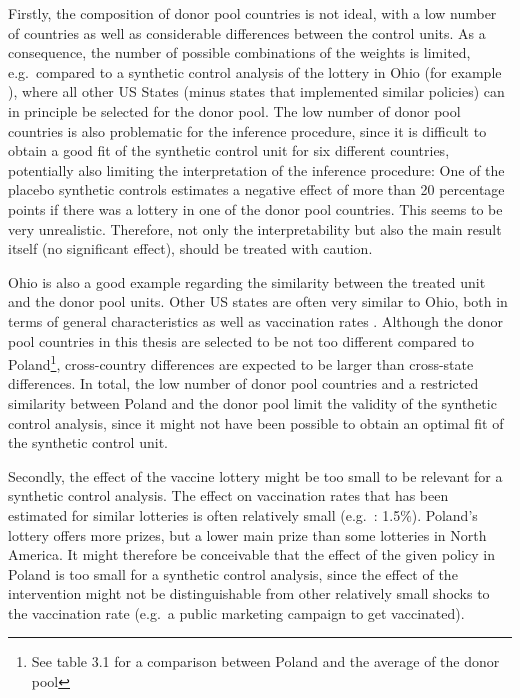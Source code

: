 \documentclass{scrbook}
\begin{document}
Firstly, the composition of donor pool countries is not ideal, with a
low number of countries as well as considerable differences between the
control units. As a consequence, the number of possible combinations of
the weights is limited, e.g.~compared to a synthetic control analysis of
the lottery in Ohio (for example \textcite{barber_conditional_2022}),
where all other US States (minus states that implemented similar
policies) can in principle be selected for the donor pool. The low
number of donor pool countries is also problematic for the inference
procedure, since it is difficult to obtain a good fit of the synthetic
control unit for six different countries, potentially also limiting the
interpretation of the inference procedure: One of the placebo synthetic
controls estimates a negative effect of more than 20 percentage points
if there was a lottery in one of the donor pool countries. This seems to
be very unrealistic. Therefore, not only the interpretability but also
the main result itself (no significant effect), should be treated with
caution.

Ohio is also a good example regarding the similarity between the treated
unit and the donor pool units. Other US states are often very similar to
Ohio, both in terms of general characteristics as well as vaccination
rates \parencite{mathieu_global_2021}. Although the donor pool countries
in this thesis are selected to be not too different compared to
Poland\footnote{See table 3.1 for a comparison between Poland and the average of the donor pool},
cross-country differences are expected to be larger than cross-state
differences. In total, the low number of donor pool countries and a
restricted similarity between Poland and the donor pool limit the
validity of the synthetic control analysis, since it might not have been
possible to obtain an optimal fit of the synthetic control unit.

Secondly, the effect of the vaccine lottery might be too small to be
relevant for a synthetic control analysis. The effect on vaccination
rates that has been estimated for similar lotteries is often relatively
small (e.g.~\textcite{barber_conditional_2022}: 1.5\%). Poland's lottery
offers more prizes, but a lower main prize than some lotteries in North
America. It might therefore be conceivable that the effect of the given
policy in Poland is too small for a synthetic control analysis, since
the effect of the intervention might not be distinguishable from other
relatively small shocks to the vaccination rate (e.g.~a public marketing
campaign to get vaccinated).
\end{document}
